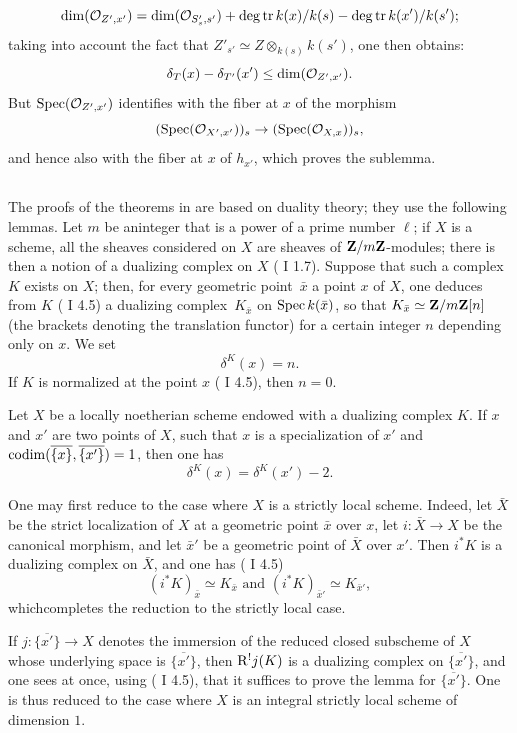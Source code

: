 $$
\dim(\mathcal O_{Z', x'})=\dim(\mathcal O_{S'_s, s'})+\operatorname{deg\,tr} k(x)/k(s)-\operatorname{deg\,tr} k(x')/k(s');$$
taking into account the fact that $Z'_{s'}\simeq Z\otimes_{k(s)}k(s')$, one then obtains:
$$
\delta_T(x)-\delta_{T'}(x')\leq\dim(\mathcal O_{Z', x'}).
$$
But $\operatorname{Spec}(\mathcal O_{Z', x'})$ identifies with the fiber at $x$ of the morphism
$$(\operatorname{Spec}(\mathcal O_{X', x'}))_s\to(\operatorname{Spec}(\mathcal O_{X, x}))_s,
$$
and hence also with the fiber at $x$ of $h_{x'}$, which proves the sublemma.

\subsection{\texorpdfstring{}{XIV.2.3}} \label{XIV.2.3}
The proofs of the theorems in \numero {} are based on duality theory; they use the following lemmas. Let $m$ be an\pageoriginale integer that is a power of a prime number $\ell$; if $X$ is a scheme, all the sheaves considered on $X$ are sheaves of $\mathbf Z/m\mathbf Z$-modules; there is then a notion of a dualizing complex on $X$ ( I 1.7). Suppose that such a complex $K$ exists on $X$; then, for every geometric point~$\bar x$  a point $x$ of $X$, one deduces from $K$ (\cf {} I 4.5) a dualizing complex~$K_{\bar x}$ on $\operatorname{Spec} k(\bar x)$, so that $K_{\bar x}\simeq\mathbf Z/m\mathbf Z[n]$ (the brackets denoting the translation functor) for a certain integer $n$ depending only on $x$. We set
$$
\delta^K(x)=n.
$$
If $K$ is normalized at the point $x$ ( I 4.5), then $n=0$.

\begin{sublemme} \label{XIV.2.3.1} Let $X$ be a locally noetherian scheme endowed with a dualizing complex $K$. If $x$ and $x'$ are two points of $X$, such that $x$ is a specialization of $x'$ and $\operatorname{codim}(\overline{\{x\}}, \overline{\{x'\}})=1$, then one has
$$
\delta^K(x)=\delta^{K}(x')-2.
$$
\end{sublemme}

One may first reduce to the case where $X$ is a strictly local scheme. Indeed, let $\bar X$ be the strict localization of $X$ at a geometric point $\bar x$ over $x$, let $i:\bar X\to X$ be the canonical morphism, and let $\bar x'$ be a geometric point of $\bar X$ over $x'$. Then $i^*K$ is a dualizing complex on $\bar X$, and one has ( I 4.5)
$$
(i^*K)_{\bar x}\simeq K_{\bar x}\text{ and } (i^*K)_{\bar x'}\simeq K_{\bar x'},
$$
which\pageoriginale completes the reduction to the strictly local case.

If $j:\overline{\{x'\}}\to X$ denotes the immersion of the reduced closed subscheme of $X$ whose underlying space is $\overline{\{x'\}}$, then $\mathrm R^!j(K)$ is a dualizing complex on $\overline{\{x'\}}$, and one sees at once, using ( I 4.5), that it suffices to prove the lemma for $\overline{\{x'\}}$. One is thus reduced to the case where $X$ is an integral strictly local scheme of dimension $1$.

